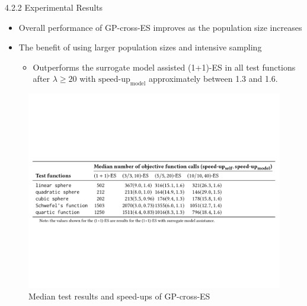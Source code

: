 \documentclass{beamer}
\begin{document}
\begin{frame}{4.2.2 Experimental Results}
\begin{itemize}
    \item Overall performance of GP-cross-ES improves as the population size increases 
    \item The benefit of using larger population sizes and intensive sampling 
    \begin{itemize}
        \item Outperforms the surrogate model assisted (1+1)-ES in all test functions after $\lambda\geq 20$ with $\text{speed-up}_{\text{model}}$ approximately between 1.3 and 1.6. 
    \end{itemize}
\end{itemize}
\begin{figure}
\includegraphics[width=1.0\linewidth]{tab-GP-cross-ES.pdf}
    \caption{Median test results and speed-ups of GP-cross-ES}
\end{figure}


\end{frame}
\end{document}
